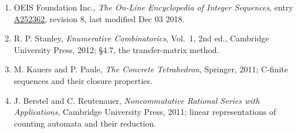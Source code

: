 \documentclass[11pt]{article}
\theoremstyle{definition}
\begin{document}
\begin{enumerate}

\item OEIS Foundation Inc., \emph{The On-Line Encyclopedia of Integer Sequences}, entry \href{https://oeis.org/A252362}{A252362}, revision 8, last modified Dec 03 2018.

\item R. P. Stanley, \emph{Enumerative Combinatorics}, Vol.~1, 2nd ed., Cambridge University Press, 2012; \S4.7, the transfer-matrix method.

\item M. Kauers and P. Paule, \emph{The Concrete Tetrahedron}, Springer, 2011; C-finite sequences and their closure properties.

\item J. Berstel and C. Reutenauer, \emph{Noncommutative Rational Series with Applications}, Cambridge University Press, 2011; linear representations of counting automata and their reduction.

\end{enumerate}
\end{document}
